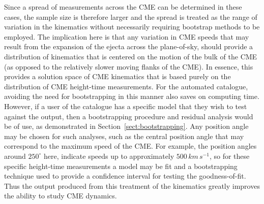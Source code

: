 \documentclass[structabstract]{aa}
\begin{document}
Since a spread of measurements across the CME can be determined in these cases, the sample size is therefore larger and the spread is treated as the range of variation in the kinematics without necessarily requiring bootstrap methods to be employed. The implication here is that any variation in CME speeds that may result from the expansion of the ejecta across the plane-of-sky, should provide a distribution of kinematics that is centered on the motion of the bulk of the CME (as opposed to the relatively slower moving flanks of the CME). In essence, this provides a solution space of CME kinematics that is based purely on the distribution of CME height-time measurements. For the automated catalogue, avoiding the need for bootstrapping in this manner also saves on computing time. However, if a user of the catalogue has a specific model that they wish to test against the output, then a bootstrapping procedure and residual analysis would be of use, as demonstrated in Section~\ref{sect:bootstrapping}. Any position angle may be chosen for such analyses, such as the central position angle that may correspond to the maximum speed of the CME. For example, the position angles around $250^{\circ}$ here, indicate speeds up to approximately $500\,km\,s^{-1}$, so for these specific height-time measurements a model may be fit and a bootstrapping technique used to provide a confidence interval for testing the goodness-of-fit. Thus the output produced from this treatment of the kinematics greatly improves the ability to study CME dynamics.

\end{document}
